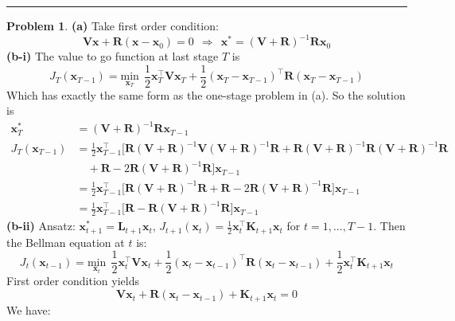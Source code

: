 \documentclass[a4paper, 8pt]{article}
\theoremstyle{definition}
\newtheorem{problem}{Problem}
\theoremstyle{hSol}
\begin{document}
\noindent\rule{16cm}{0.4pt}
\begin{problem} \textbf{(a)} Take first order condition:
\begin{equation}
	\bm{Vx} + \bm{R}(\bm{x}-\bm{x}_0) = 0 ~~\Rightarrow~~\bm{x}^* = (\bm{V}+\bm{R})^{-1}\bm{Rx}_0
\end{equation}
\textbf{(b-i)} The value to go function at last stage $T$ is
\begin{equation}
	J_T(\bm{x}_{T-1}) = \underset{\bm{x}_T}{\text{min}} ~~\frac{1}{2}\bm{x}_T^{\top} \bm{V} \bm{x}_T + \frac{1}{2}(\bm{x}_T- \bm{x}_{T-1} )^{\top}\bm{R}(\bm{x}_T- \bm{x}_{T-1})
\end{equation}
Which has exactly the same form as the one-stage problem in (a). So the solution is
\begin{equation}
	\begin{split}
		\bm{x}_T^* &= (\bm{V}+\bm{R})^{-1}\bm{Rx}_{T-1} \\
		J_T(\bm{x}_{T-1})&= \frac{1}{2} \bm{x}_{T-1}^{\top}\Big[\bm{R}(\bm{V}+\bm{R})^{-1}\bm{V}(\bm{V}+\bm{R})^{-1}\bm{R} + \bm{R}(\bm{V}+\bm{R})^{-1}\bm{R}(\bm{V}+\bm{R})^{-1}\bm{R} \\
		&\quad+\bm{R} - 2\bm{R}(\bm{V}+\bm{R})^{-1}\bm{R}\Big] \bm{x}_{T-1}\\
		&=\frac{1}{2} \bm{x}_{T-1}^{\top}\Big[\bm{R}(\bm{V}+\bm{R})^{-1}\bm{R} + \bm{R} - 2\bm{R}(\bm{V}+\bm{R})^{-1}\bm{R}\Big] \bm{x}_{T-1}\\
		&=\frac{1}{2} \bm{x}_{T-1}^{\top}\Big[ \bm{R} - \bm{R}(\bm{V}+\bm{R})^{-1}\bm{R}\Big] \bm{x}_{T-1}
	\end{split}
\end{equation}
\textbf{(b-ii)} Ansatz: $\bm{x}^*_{t+1} = \bm{L}_{t+1}\bm{x}_{t}$, $J_{t+1}(\bm{x}_{t}) = \frac{1}{2}\bm{x}_{t}^{\top}\bm{K}_{t+1} \bm{x}_{t}$ for $t=1,...,T-1$. Then the Bellman equation at $t$ is:
\begin{equation}
		J_t(\bm{x}_{t-1}) = \underset{\bm{x}_t}{\text{min}} ~~\frac{1}{2}\bm{x}_t^{\top} \bm{V} \bm{x}_t + \frac{1}{2}(\bm{x}_t- \bm{x}_{t-1} )^{\top}\bm{R}(\bm{x}_t- \bm{x}_{t-1}) + \frac{1}{2}\bm{x}_{t}^{\top}\bm{K}_{t+1} \bm{x}_{t}
\end{equation}
First order condition yields
\begin{equation}
	\bm{V}\bm{x}_t + \bm{R}(\bm{x}_t - \bm{x}_{t-1}) + \bm{K}_{t+1} \bm{x}_{t} = 0
\end{equation}
We have:
\begin{equation}
	\begin{split}

\end{split}
\end{equation}
\end{problem}
\end{document}
